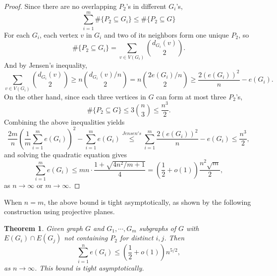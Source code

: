 \documentclass[12pt]{report}
\newtheorem{theorem}{Theorem}[chapter]
\begin{document}
\begin{proof}
  Since there are no overlapping $P_2$'s in different $G_i$'s, 
  \[
    \sum_{i = 1}^m \#\{P_2 \subseteq G_i\} \leq \#\{P_2 \subseteq G\}
  \]
  For each $G_i$, each vertex $v$ in $G_i$ and two of its neighbors form one unique $P_2$, so
  \[
    \#\{P_2 \subseteq G_i\} = \sum_{v \in V(G_i)} \binom{d_{G_i}(v)}{2}.
  \]
  And by Jensen's inequality,
  \[
    \sum_{v \in V(G_i)} \binom{d_{G_i}(v)}{2} \geq n\binom{d_{G_i}(v)/n}{2} = n\binom{2e(G_i)/n}{2} \geq \frac{2(e(G_i))^2}{n} - e(G_i).
  \]
  On the other hand, since each three vertices in $G$ can form at most three $P_2$'s, 
  \[
    \#\{P_2 \subseteq G\} \leq 3\binom{n}{3} \leq \frac{n^3}{2}.
  \]
  Combining the above inequalities yields
  \[
    \frac{2m}{n}\left(\frac{1}{m}\sum_{i = 1}^m e(G_i)\right)^2 - \sum_{i = 1}^m e(G_i) \overset{Jensen's}{\leq} \sum_{i = 1}^m \frac{2(e(G_i))^2}{n} - e(G_i) \leq \frac{n^3}{2},
  \]
  and solving the quadratic equation gives
  \[
    \sum_{i = 1}^m e(G_i) \leq mn \cdot \frac{1 + \sqrt{4n^2/m + 1}}{4} =  \left(\frac{1}{2} + o(1)\right)\frac{n^{2}\sqrt{m}}{2},
  \]
  as $n \to \infty$ or $m \to \infty$.
\end{proof}

When $n = m$, the above bound is tight asymptotically, as shown by the following construction using projective
planes.

\begin{theorem}
  Given graph $G$ and $G_1, \cdots, G_m$ subgraphs of $G$ with $E(G_i) \cap E(G_j)$ not containing
  $P_2$ for distinct $i, j$. Then
  \[
    \sum_{i = 1}^n e(G_i) \leq \left(\frac{1}{2} + o(1)\right)n^{5/2},
  \]
  as $n \to \infty$. This bound is tight asymptotically.
\end{theorem}
\end{document}
